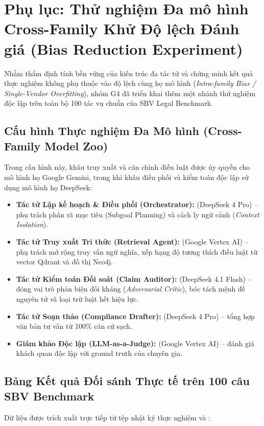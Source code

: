 \documentclass[10pt,a4paper]{article}
\begin{document}
\newpage
\appendix
\setcounter{page}{1}
\renewcommand{\thepage}{A-\arabic{page}}
\section{Phụ lục: Thử nghiệm Đa mô hình Cross-Family Khử Độ lệch Đánh giá (Bias Reduction Experiment)}
\label{sec:appendix-cross-model}

Nhằm thẩm định tính bền vững của kiến trúc đa tác tử và chứng minh kết quả thực nghiệm không phụ thuộc vào độ lệch cùng họ mô hình (\emph{Intra-family Bias / Single-Vendor Overfitting}), nhóm G4 đã triển khai thêm một nhánh thử nghiệm độc lập trên toàn bộ 100 tác vụ chuẩn của SBV Legal Benchmark.

\subsection{Cấu hình Thực nghiệm Đa Mô hình (Cross-Family Model Zoo)}
Trong cấu hình này, khâu truy xuất và căn chỉnh điều luật được ủy quyền cho mô hình họ Google Gemini, trong khi khâu điều phối và kiểm toán độc lập sử dụng mô hình họ DeepSeek:
\begin{itemize}[nosep,itemsep=1pt]
  \item \textbf{Tác tử Lập kế hoạch \& Điều phối (Orchestrator):}  (DeepSeek 4 Pro) -- phụ trách phân rã mục tiêu (Subgoal Planning) và cách ly ngữ cảnh (\emph{Context Isolation}).
  \item \textbf{Tác tử Truy xuất Tri thức (Retrieval Agent):}  (Google Vertex AI) -- phụ trách mở rộng truy vấn ngữ nghĩa, xếp hạng độ tương thích điều luật từ vector Qdrant và đồ thị Neo4j.
  \item \textbf{Tác tử Kiểm toán Đối soát (Claim Auditor):}  (DeepSeek 4.1 Flash) -- đóng vai trò phản biện đối kháng (\emph{Adversarial Critic}), bóc tách mệnh đề nguyên tử và loại trừ luật hết hiệu lực.
  \item \textbf{Tác tử Soạn thảo (Compliance Drafter):}  (DeepSeek 4 Pro) -- tổng hợp văn bản tư vấn từ 100\% căn cứ sạch.
  \item \textbf{Giám khảo Độc lập (LLM-as-a-Judge):}  (Google Vertex AI) -- đánh giá khách quan độc lập với ground truth của chuyên gia.
\end{itemize}

\subsection{Bảng Kết quả Đối sánh Thực tế trên 100 câu SBV Benchmark}
Dữ liệu được trích xuất trực tiếp từ tệp nhật ký thực nghiệm  và :
\end{document}
